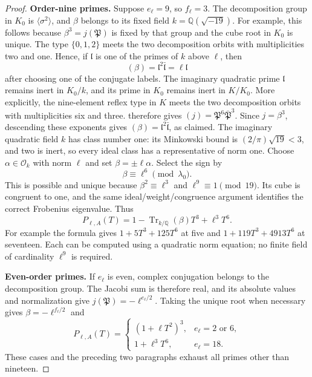 \begin{proof}
\par\medskip\noindent\textbf{Order-nine primes.} 
Suppose $e_\ell=9$, so $f_\ell=3$.  The decomposition group
in $K_0$ is $\langle\sigma^2\rangle$, and $\beta$ belongs
to its fixed field $k=\mathbb Q(\sqrt{-19})$.  For example,
this follows because $\beta^3=j(\mathfrak P)$ is fixed by
that group and the cube root in $K_0$ is unique.  The
type $\{0,1,2\}$ meets the two decomposition orbits with
multiplicities two and one.  Hence, if $\mathfrak l$ is
one of the primes of $k$ above $\ell$, then
\[
 (\beta)=\mathfrak l^2\bar{\mathfrak l}
          =\ell\mathfrak l
\]
after choosing one of the conjugate labels.  The imaginary
quadratic prime $\mathfrak l$ remains inert in $K_0/k$,
and its prime in $K_0$ remains inert in $K/K_0$.
More explicitly, the nine-element reflex type in $K$
meets the two decomposition orbits with multiplicities
six and three.  \citet[equation~(2.1), author p.~5]{ShuExpanded2021} therefore gives
$(j)=\mathfrak P^6\bar{\mathfrak P}^{3}$.
Since $j=\beta^3$, descending these exponents gives
$(\beta)=\mathfrak l^2\bar{\mathfrak l}$, as claimed.
The imaginary
quadratic field $k$ has class number one: its Minkowski
bound is $(2/\pi)\sqrt{19}<3$, and two is inert, so every
ideal class has a representative of norm one.
Choose $\alpha\in\mathcal O_k$ with norm $\ell$ and set
$\beta=\pm\ell\alpha$.  Select the sign by
\[
 \beta\equiv\ell^6\pmod{\lambda_0}.
\]
This is possible and unique because $\beta^2\equiv\ell^3$
and $\ell^9\equiv1\pmod{19}$.  Its cube is congruent to
one, and the same ideal/weight/congruence argument
identifies the correct Frobenius eigenvalue.  Thus
\[
 P_{\ell,A}(T)=1-\operatorname{Tr}_{k/\mathbb Q}(\beta)T^3
                   +\ell^3T^6.
\]
For example the formula gives $1+5T^3+125T^6$ at five
and $1+119T^3+4913T^6$ at seventeen.  Each can be computed
using a quadratic norm equation; no finite field of
cardinality $\ell^9$ is required.

\par\medskip\noindent\textbf{Even-order primes.} 
If $e_\ell$ is even, complex conjugation belongs to the
decomposition group.  The Jacobi sum is therefore real,
and its absolute values and normalization give
$j(\mathfrak P)=-\ell^{e_\ell/2}$.  Taking the unique
root when necessary gives $\beta=-\ell^{f_\ell/2}$ and
\[
 P_{\ell,A}(T)=
 \begin{cases}
 (1+\ell T^2)^3,&e_\ell=2\text{ or }6,\\
 1+\ell^3T^6,&e_\ell=18.
 \end{cases}
\]
These cases and the preceding two paragraphs exhaust all
primes other than nineteen.


\end{proof}
